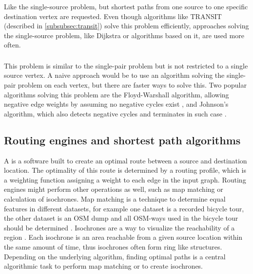 		\subsubsection{}
		
			Like the single-source problem, but shortest paths from one source to one specific destination vertex are requested.
			Even though algorithms like TRANSIT (described in \cref{subsubsec:transit}) solve this problem efficiently, approaches solving the single-source problem, like Dijkstra or algorithms based on it, are used more often.
		
		\subsubsection{}
		\label{subsubsec:all-pair-shortest-path}
		
			This problem is similar to the single-pair problem but is not restricted to a single source vertex.
			A naive approach would be to use an algorithm solving the single-pair problem on each vertex, but there are faster ways to solve this.
			Two popular algorithms solving this problem are the Floyd-Warshall algorithm, allowing negative edge weights by assuming no negative cycles exist \cite[693]{cormen-introduction-to-alg}, and Johnson's algorithm, which also detects negative cycles and terminates in such case \cite[700]{cormen-introduction-to-alg}.
		
	\subsection{Routing engines and shortest path algorithms}
	\label{subsec:routing-engines}
		
		A  is a software built to create an optimal route between a source and destination location.
		The optimality of this route is determined by a routing profile, which is a weighting function assigning a weight to each edge in the input graph.
		Routing engines might perform other operations as well, such as map matching or calculation of isochrones.
		Map matching is a technique to determine equal features in different datasets, for example one dataset is a recorded bicycle tour, the other dataset is an OSM dump and all OSM-ways used in the bicycle tour should be determined \cite{saki-map-matching}.
		Isochrones are a way to visualize the reachability of a region \cite{allen-isochrones}.
		Each isochrone is an area reachable from a given source location within the same amount of time, thus isochrones often form ring like structures.
		Depending on the underlying algorithm, finding optimal paths is a central algorithmic task to perform map matching or to create isochrones.
		
